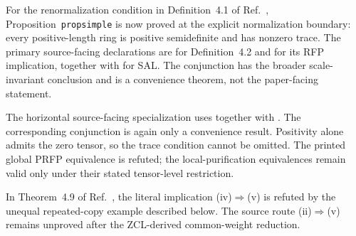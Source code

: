 \documentclass{article}
\begin{document}
For the renormalization condition in Definition~4.1 of
Ref.~\cite{Cirac2016MPDO_arXiv}, Proposition~\texttt{propsimple} is now proved
at the explicit normalization boundary: every positive-length ring is
positive semidefinite and has nonzero trace. The primary source-facing
declarations are  for
Definition~4.2 and
 for its RFP
implication, together with
 for SAL. The
conjunction
has the broader scale-invariant conclusion and is a convenience theorem, not
the paper-facing statement.

The horizontal source-facing specialization uses
 together with
. The corresponding
 conjunction is again only a convenience result.
Positivity alone admits the zero tensor, so the trace condition cannot be
omitted. The printed global PRFP equivalence is refuted; the local-purification
equivalences remain valid only under their stated tensor-level restriction.

In Theorem~4.9 of Ref.~\cite{Cirac2016MPDO_arXiv}, the literal implication
(iv)$\Rightarrow$(v) is refuted by the unequal repeated-copy example described
below. The source route (ii)$\Rightarrow$(v) remains unproved after the
ZCL-derived common-weight reduction.
\end{document}
